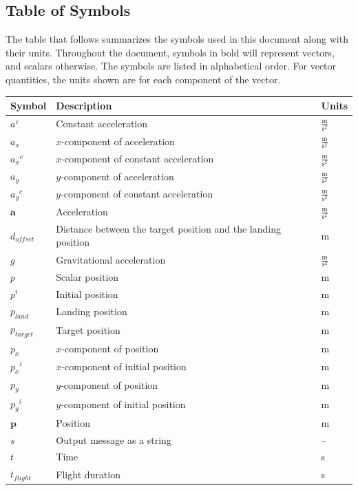 \documentclass[12pt]{article}
\begin{document}
\subsection{Table of Symbols}
\label{Sec:ToS}
The table that follows summarizes the symbols used in this document along with their units. Throughout the document, symbols in bold will represent vectors, and scalars otherwise. The symbols are listed in alphabetical order. For vector quantities, the units shown are for each component of the vector.
\begin{longtabu}{l X[l] l}
\toprule
\textbf{Symbol} & \textbf{Description} & \textbf{Units}
\\
\midrule
\endhead
${a^{c}}$ & Constant acceleration & $\frac{\text{m}}{\text{s}^{2}}$
\\
${a_{x}}$ & $x$-component of acceleration & $\frac{\text{m}}{\text{s}^{2}}$
\\
${{a_{x}}^{c}}$ & $x$-component of constant acceleration & $\frac{\text{m}}{\text{s}^{2}}$
\\
${a_{y}}$ & $y$-component of acceleration & $\frac{\text{m}}{\text{s}^{2}}$
\\
${{a_{y}}^{c}}$ & $y$-component of constant acceleration & $\frac{\text{m}}{\text{s}^{2}}$
\\
$\mathbf{a}$ & Acceleration & $\frac{\text{m}}{\text{s}^{2}}$
\\
${d_{offset}}$ & Distance between the target position and the landing position & m
\\
$g$ & Gravitational acceleration & $\frac{\text{m}}{\text{s}^{2}}$
\\
$p$ & Scalar position & m
\\
${p^{i}}$ & Initial position & m
\\
${p_{land}}$ & Landing position & m
\\
${p_{target}}$ & Target position & m
\\
${p_{x}}$ & $x$-component of position & m
\\
${{p_{x}}^{i}}$ & $x$-component of initial position & m
\\
${p_{y}}$ & $y$-component of position & m
\\
${{p_{y}}^{i}}$ & $y$-component of initial position & m
\\
$\mathbf{p}$ & Position & m
\\
$s$ & Output message as a string & --
\\
$t$ & Time & s
\\
${t_{flight}}$ & Flight duration & s
\\

\end{longtabu}
\end{document}
